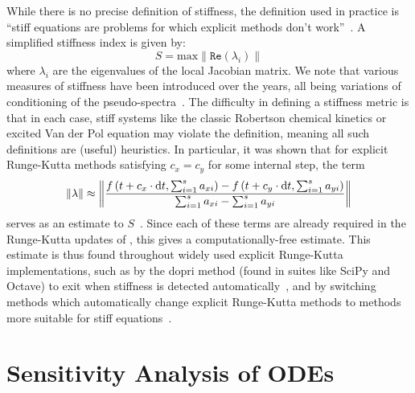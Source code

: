 While there is no precise definition of stiffness, the definition used in practice is ``stiff equations are problems for which explicit methods don't work''~\citep{wanner1996solving,shampine1979user}. A simplified stiffness index is given by:
%
\begin{equation}
  S = \text{max}\|\texttt{Re}(\lambda_i)\|
\end{equation}
%
where $\lambda_i$ are the eigenvalues of the local Jacobian matrix. We note that various measures of stiffness have been introduced over the years, all being variations of conditioning of the pseudo-spectra~\citep{shampine2007stiff, higham1993stiffness}. The difficulty in defining a stiffness metric is that in each case, stiff systems like the classic Robertson chemical kinetics or excited Van der Pol equation may violate the definition, meaning all such definitions are (useful) heuristics. In particular, it was shown that for explicit Runge-Kutta methods satisfying $c_x = c_y$ for some internal step, the term
%
\begin{equation}
  \|\lambda\| \approx \left\Vert\frac{ f\left(t + c_x \cdot \mathrm{d}t,\sum_{i=1}^{s} a_{xi}\right) - f\left(t + c_y \cdot \mathrm{d}t,\sum_{i=1}^{s} a_{yi}\right)}{\sum_{i=1}^{s} a_{xi} - \sum_{i=1}^{s} a_{yi}}\right\Vert
\end{equation}
%
serves as an estimate to $S$~\citep{shampine1977stiffness}. Since each of these terms are already required in the Runge-Kutta updates of , this gives a computationally-free estimate. This estimate is thus found throughout widely used explicit Runge-Kutta implementations, such as by the dopri method (found in suites like SciPy and Octave) to exit when stiffness is detected automatically~\citep{wanner1996solving}, and by switching methods which automatically change explicit Runge-Kutta methods to methods more suitable for stiff equations~\citep{rackauckas2019confederated}.

\section{Sensitivity Analysis of ODEs}
\label{sec:sensitivity_analysis_odes}

